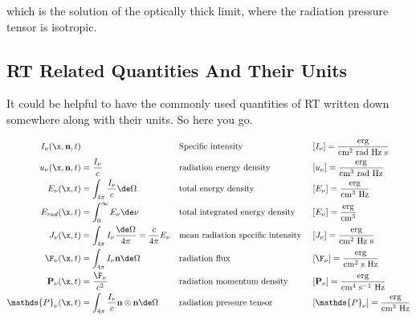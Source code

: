 which is the solution of the optically thick limit, where the radiation pressure tensor is isotropic.



\subsection{RT Related Quantities And Their Units}

It could be helpful to have the commonly used quantities of RT written down
somewhere along with their units. So here you go.


\begin{align*}
	I_\nu (\x, \mathbf{n}, t) &
			&& \text{Specific intensity}
			&& [I_\nu] = \frac{\text{erg}}{\text{cm}^2 \text{ rad Hz s}} \\
	u_\nu (\x, \mathbf{n}, t) &= \frac{I_\nu}{c}
			&& \text{radiation energy density }
			&& [u_\nu] = \frac{\text{erg}}{\text{cm}^3 \text{ rad Hz}}\\
	E_\nu (\x, t) &= \int_{4 \pi} \frac{I_\nu}{c} \de \Omega
			&& \text{total energy density }
			&& [E_\nu] = \frac{\text{erg}}{\text{cm}^3 \text{ Hz}}\\
	E_{rad} (\x, t) &= \int_{0}^{\infty} E_\nu \de \nu
			&& \text{total integrated energy density }
			&& [E_\nu] = \frac{\text{erg}}{\text{cm}^3}\\
	J_\nu (\x, t) &= \int_{4 \pi} I_\nu \frac{\de \Omega}{4 \pi}
			= \frac{c}{4 \pi} E_\nu
			&& \text{mean radiation specific intensity }
			&& [J_\nu] = \frac{\text{erg}}{\text{cm}^2 \text{ Hz s}}\\
	\F_\nu(\x, t) &= \int_{4 \pi}  I_\nu \mathbf{n} \de \Omega
			&& \text{radiation flux }
			&& [\F_\nu] = \frac{\text{erg}}{\text{cm}^2 \text{ s Hz}}\\
	\mathbf{P}_\nu (\x, t) &= \frac{\F_\nu}{c^2}
			&& \text{radiation momentum density }
			&& [\mathbf{P}_\nu] = \frac{\text{erg}}{ \text{cm}^4 \text{ s}^{-1} \text{ Hz}}\\
	\mathds{P}_\nu (\x, t) &= \int_{4 \pi} \frac{I_\nu}{c} \mathbf{n} \otimes \mathbf{n} \de \Omega
			&& \text{radiation pressure tensor }
			&& [\mathds{P}_\nu ] = \frac{\text{erg}}{\text{cm}^3 \text{ Hz}}
\end{align*}



